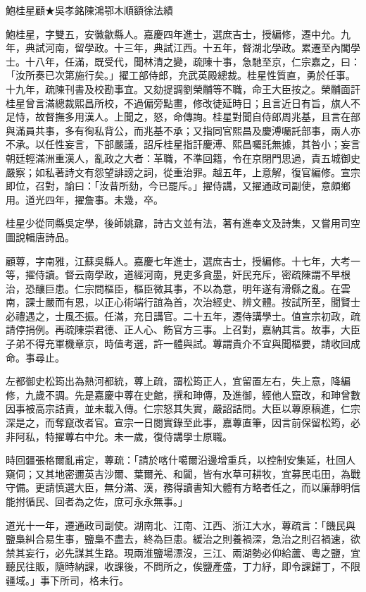 
\begin{pinyinscope}
鮑桂星顧★吳孝銘陳鴻鄂木順額徐法績

鮑桂星，字雙五，安徽歙縣人。嘉慶四年進士，選庶吉士，授編修，遷中允。九年，典試河南，留學政。十三年，典試江西。十五年，督湖北學政。累遷至內閣學士。十八年，任滿，既受代，聞林清之變，疏陳十事，急馳至京，仁宗嘉之，曰：「汝所奏已次第施行矣。」擢工部侍郎，充武英殿總裁。桂星性質直，勇於任事。十九年，疏陳刊書及校勘事宜。又劾提調劉榮黼等不職，命王大臣按之。榮黼面訐桂星曾言滿總裁熙昌所校，不過偏旁點畫，修改徒延時日；且言近日有旨，旗人不足恃，故督撫多用漢人。上聞之，怒，命傳詢。桂星對聞自侍郎周兆基，且言在部與滿員共事，多有徇私背公，而兆基不承；又指同官熙昌及慶溥囑託部事，兩人亦不承。以任性妄言，下部嚴議，詔斥桂星指訐慶溥、熙昌囑託無據，其咎小；妄言朝廷輕滿洲重漢人，亂政之大者：革職，不準回籍，令在京閉門思過，責五城御史嚴察；如私著詩文有怨望誹謗之詞，從重治罪。越五年，上意解，復官編修。宣宗即位，召對，諭曰：「汝昔所劾，今已罷斥。」擢侍講，又擢通政司副使，意頗鄉用。道光四年，擢詹事。未幾，卒。

桂星少從同縣吳定學，後師姚鼐，詩古文並有法，著有進奉文及詩集，又嘗用司空圖說輯唐詩品。

顧蓴，字南雅，江蘇吳縣人。嘉慶七年進士，選庶吉士，授編修。十七年，大考一等，擢侍讀。督云南學政，道經河南，見吏多貪墨，奸民充斥，密疏陳謂不早根治，恐釀巨患。仁宗問樞臣，樞臣微其事，不以為意，明年遂有滑縣之亂。在雲南，課士嚴而有恩，以正心術端行誼為首，次治經史、辨文體。按試所至，聞賢士必禮遇之，士風丕振。任滿，充日講官。二十五年，遷侍講學士。值宣宗初政，疏請停捐例。再疏陳崇君德、正人心、飭官方三事。上召對，嘉納其言。故事，大臣子弟不得充軍機章京，時值考選，許一體與試。蓴謂貴介不宜與聞樞要，請收回成命。事尋止。

左都御史松筠出為熱河都統，蓴上疏，謂松筠正人，宜留置左右，失上意，降編修，九歲不調。先是嘉慶中蓴在史館，撰和珅傳，及進御，經他人竄改，和珅曾數因事被高宗詰責，並未載入傳。仁宗怒其失實，嚴詔詰問。大臣以蓴原稿進，仁宗深是之，而奪竄改者官。宣宗一日閱實錄至此事，嘉蓴直筆，因言前保留松筠，必非阿私，特擢蓴右中允。未一歲，復侍講學士原職。

時回疆張格爾亂甫定，蓴疏：「請於喀什噶爾沿邊增重兵，以控制安集延，杜回人窺伺；又其地密邇英吉沙爾、葉爾羌、和闐，皆有水草可耕牧，宜募民屯田，為戰守備。更請慎選大臣，無分滿、漢，務得讀書知大體有方略者任之，而以廉靜明信能拊循民、回者為之佐，庶可永永無事。」

道光十一年，遷通政司副使。湖南北、江南、江西、浙江大水，蓴疏言：「饑民與鹽梟糾合易生事，鹽梟不盡去，終為巨患。緩治之則養禍深，急治之則召禍速，欲禁其妄行，必先謀其生路。現兩淮鹽場漂沒，三江、兩湖勢必仰給蘆、粵之鹽，宜聽民往販，隨時納課，收課後，不問所之，俟鹽產盛，丁力紓，即令課歸丁，不限疆域。」事下所司，格未行。


\end{pinyinscope}
